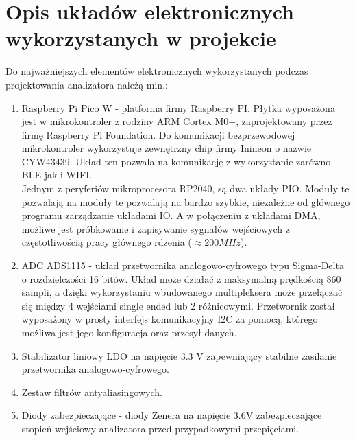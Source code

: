 \section{Opis układów elektronicznych wykorzystanych w projekcie}

Do najważniejszych elementów elektronicznych wykorzystanych 
podczas projektowania analizatora należą min.:
 
\begin{enumerate}
    \item Raspberry Pi Pico W - platforma firmy Raspberry PI.
        Płytka wyposażona jest w mikrokontroler z rodziny ARM Cortex M0+, zaprojektowany przez firmę Raspberry Pi Foundation.
        Do komunikacji bezprzewodowej mikrokontroler wykorzystuje zewnętrzny chip firmy Inineon o nazwie CYW43439.
        Układ ten pozwala na komunikację z wykorzystanie zarówno BLE jak i WIFI.\\
        Jednym z peryferiów mikroprocesora RP2040, są dwa układy PIO.
        Moduły te pozwalają na moduły te pozwalają na bardzo szybkie, niezależne od głównego programu zarządzanie układami IO.
        A w połączeniu z układami DMA, możliwe jest próbkowanie i zapisywanie sygnałów wejściowych z częstotliwością pracy głównego rdzenia ($\approx 200MHz$).
    \item ADC ADS1115 - 
        układ przetwornika analogowo-cyfrowego typu Sigma-Delta o rozdzielczości 16 bitów.
        Układ może działać z maksymalną prędkością 860 sampli,
        a dzięki wykorzystaniu wbudowanego multipleksera może przełączać się między 4 wejściami single ended lub 2 różnicowymi.
        Przetwornik został wyposażony w prosty interfejs komunikacyjny I2C za pomocą, którego możliwa jest jego konfiguracja oraz przesył danych.
    \item Stabilizator liniowy LDO na napięcie 3.3 V zapewniający stabilne
    zasilanie przetwornika analogowo-cyfrowego.
    \item Zestaw filtrów antyaliasingowych.
    \item Diody zabezpieczające - diody Zenera na napięcie 3.6V zabezpieczające stopień wejściowy analizatora
    przed przypadkowymi przepięciami.
\end{enumerate}
